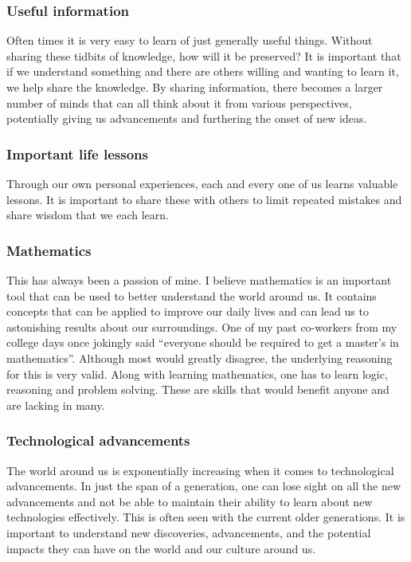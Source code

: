 \documentclass[10pt, a4paper, twocolumn]{book}
\begin{document}
\subsubsection*{Useful information}
Often times it is very easy to learn of just generally useful things. Without sharing these tidbits of knowledge, how will it be preserved? It is important that if we understand something and there are others willing and wanting to learn it, we help share the knowledge. By sharing information, there becomes a larger number of minds that can all think about it from various perspectives, potentially giving us advancements and furthering the onset of new ideas.

\subsubsection*{Important life lessons}
Through our own personal experiences, each and every one of us learns valuable lessons. It is important to share these with others to limit repeated mistakes and share wisdom that we each learn.

\subsubsection*{Mathematics}
This has always been a passion of mine. I believe mathematics is an important tool that can be used to better understand the world around us. It contains concepts that can be applied to improve our daily lives and can lead us to astonishing results about our surroundings. One of my past co-workers from my college days once jokingly said ``everyone should be required to get a master's in mathematics''. Although most would greatly disagree, the underlying reasoning for this is very valid. Along with learning mathematics, one has to learn logic, reasoning and problem solving. These are skills that would benefit anyone and are lacking in many.

\subsubsection*{Technological advancements}
The world around us is exponentially increasing when it comes to technological advancements. In just the span of a generation, one can lose sight on all the new advancements and not be able to maintain their ability to learn about new technologies effectively. This is often seen with the current older generations. It is important to understand new discoveries, advancements, and the potential impacts they can have on the world and our culture around us.
\end{document}
